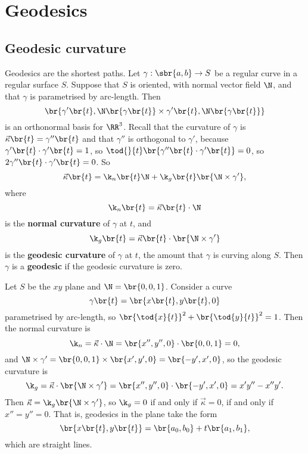 \pagebreak

\section{Geodesics}

\subsection{Geodesic curvature}

Geodesics are the shortest paths. Let $ \gamma : \sbr{a, b} \to S $ be a regular curve in a regular surface $ S $. Suppose that $ S $ is oriented, with normal vector field $ \N $, and that $ \gamma $ is parametrised by arc-length. Then
$$ \br{\gamma'\br{t}, \N\br{\gamma\br{t}} \times \gamma'\br{t}, \N\br{\gamma\br{t}}} $$
is an orthonormal basis for $ \RR^3 $. Recall that the curvature of $ \gamma $ is $ \vec{\kappa}\br{t} = \gamma''\br{t} $ and that $ \gamma'' $ is orthogonal to $ \gamma' $, because $ \gamma'\br{t} \cdot \gamma'\br{t} = 1 $, so $ \tod{}{t}\br{\gamma''\br{t} \cdot \gamma'\br{t}} = 0 $, so $ 2\gamma''\br{t} \cdot \gamma'\br{t} = 0 $. So
$$ \vec{\kappa}\br{t} = \k_n\br{t}\N + \k_g\br{t}\br{\N \times \gamma'}, $$
where
$$ \k_n\br{t} = \vec{\kappa}\br{t} \cdot \N $$
is the \textbf{normal curvature} of $ \gamma $ at $ t $, and
$$ \k_g\br{t} = \vec{\kappa}\br{t} \cdot \br{\N \times \gamma'} $$
is the \textbf{geodesic curvature} of $ \gamma $ at $ t $, the amount that $ \gamma $ is curving along $ S $. Then $ \gamma $ is a \textbf{geodesic} if the geodesic curvature is zero.


\begin{example*}
Let $ S $ be the $ xy $ plane and $ \N = \br{0, 0, 1} $. Consider a curve
$$ \gamma\br{t} = \br{x\br{t}, y\br{t}, 0} $$
parametrised by arc-length, so $ \br{\tod{x}{t}}^2 + \br{\tod{y}{t}}^2 = 1 $. Then the normal curvature is
$$ \k_n = \vec{\kappa} \cdot \N = \br{x'', y'', 0} \cdot \br{0, 0, 1} = 0, $$
and $ \N \times \gamma' = \br{0, 0, 1} \times \br{x', y', 0} = \br{-y', x', 0} $, so the geodesic curvature is
$$ \k_g = \vec{\kappa} \cdot \br{\N \times \gamma'} = \br{x'', y'', 0} \cdot \br{-y', x', 0} = x'y'' - x''y'. $$
Then $ \vec{\kappa} = \k_g\br{\N \times \gamma'} $, so $ \k_g = 0 $ if and only if $ \vec{\kappa} = 0 $, if and only if $ x'' = y'' = 0 $. That is, geodesics in the plane take the form
$$ \br{x\br{t}, y\br{t}} = \br{a_0, b_0} + t\br{a_1, b_1}, $$
which are straight lines.
\end{example*}

